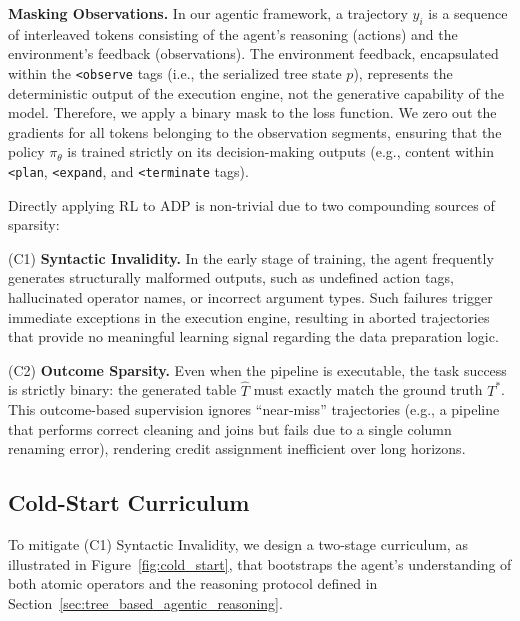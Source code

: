 \noindent \textbf{Masking Observations.} 
In our agentic framework, a trajectory $y_i$ is a sequence of interleaved tokens consisting of the agent's reasoning (actions) and the environment's feedback (observations).
The environment feedback, encapsulated within the \texttt{<observe} tags (i.e., the serialized tree state $p$), represents the deterministic output of the execution engine, not the generative capability of the model.
Therefore, we apply a binary mask to the loss function. We zero out the gradients for all tokens belonging to the observation segments, ensuring that the policy $\pi_\theta$ is trained strictly on its decision-making outputs (e.g., content within \texttt{<plan}, \texttt{<expand}, and \texttt{<terminate} tags).

Directly applying RL to ADP is non-trivial due to two compounding sources of sparsity:

\noindent(C1) \textbf{Syntactic Invalidity.} In the early stage of training, the agent frequently generates structurally malformed outputs, such as undefined action tags, hallucinated operator names, or incorrect argument types. Such failures trigger immediate exceptions in the execution engine, resulting in aborted trajectories that provide no meaningful learning signal regarding the data preparation logic.

\noindent(C2) \textbf{Outcome Sparsity.} Even when the pipeline is executable, the task success is strictly binary: the generated table $\hat{T}$ must exactly match the ground truth $T^*$. This outcome-based supervision ignores ``near-miss'' trajectories (e.g., a pipeline that performs correct cleaning and joins but fails due to a single column renaming error), rendering credit assignment inefficient over long horizons.

\subsection{Cold-Start Curriculum}
\label{subsec:cold_start}



To mitigate (C1) Syntactic Invalidity, we design a two-stage curriculum, as illustrated in Figure~\ref{fig:cold_start}, that bootstraps the agent's understanding of both atomic operators and the reasoning protocol defined in Section~\ref{sec:tree_based_agentic_reasoning}.

